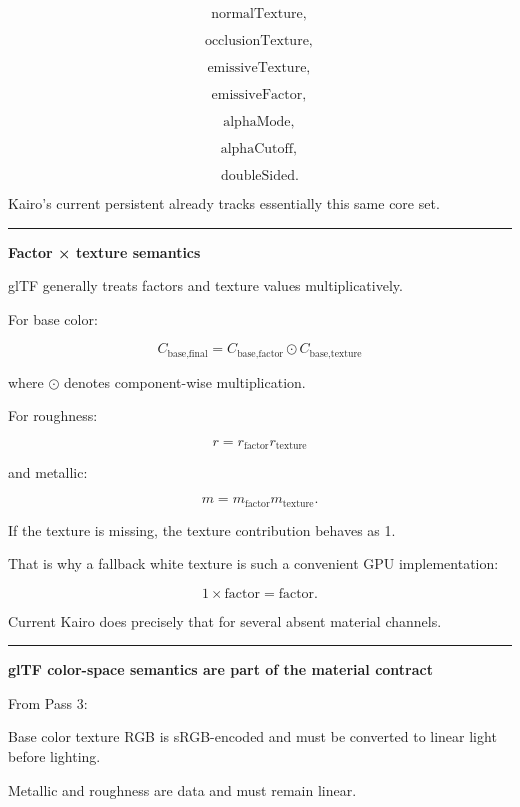 \[
\text{normalTexture},
\]

\[
\text{occlusionTexture},
\]

\[
\text{emissiveTexture},
\]

\[
\text{emissiveFactor},
\]

\[
\text{alphaMode},
\]

\[
\text{alphaCutoff},
\]

\[
\text{doubleSided}.
\]

Kairo's current persistent  already tracks essentially this same core set.

\begin{center}\rule{0.5\linewidth}{0.5pt}\end{center}

\textbf{Factor × texture semantics}

glTF generally treats factors and texture values multiplicatively.

For base color:

\[
\boxed{
C_{\text{base,final}}
=
C_{\text{base,factor}}
\odot
C_{\text{base,texture}}
}
\]

where \(\odot\) denotes component-wise multiplication.

For roughness:

\[
\boxed{
r=
r_{\text{factor}}
r_{\text{texture}}
}
\]

and metallic:

\[
\boxed{
m=
m_{\text{factor}}
m_{\text{texture}}.
}
\]

If the texture is missing, the texture contribution behaves as 1.

That is why a fallback white texture is such a convenient GPU implementation:

\[
1\times\text{factor}
=
\text{factor}.
\]

Current Kairo does precisely that for several absent material channels.

\begin{center}\rule{0.5\linewidth}{0.5pt}\end{center}

\textbf{glTF color-space semantics are part of the material contract}

From Pass 3:

Base color texture RGB is sRGB-encoded and must be converted to linear light before lighting.

Metallic and roughness are data and must remain linear.

